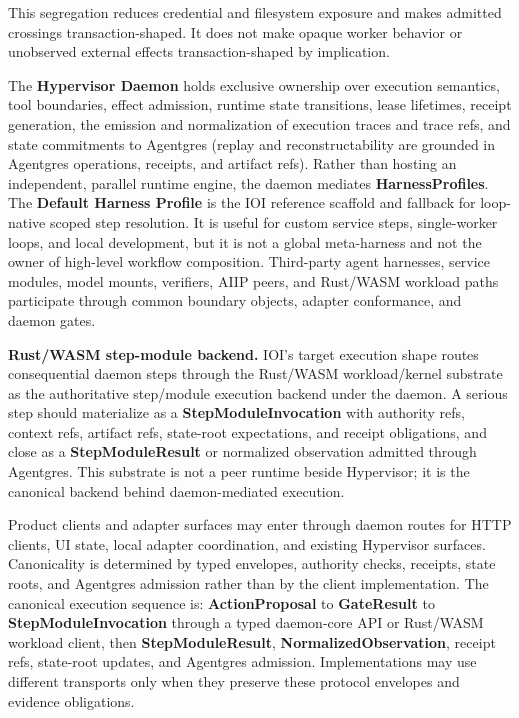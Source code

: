 \documentclass[
  11pt,
]{article}
\begin{document}
This segregation reduces credential and filesystem exposure and makes admitted
crossings transaction-shaped. It does not make opaque worker behavior or
unobserved external effects transaction-shaped by implication.

The \textbf{Hypervisor Daemon} holds exclusive ownership over execution
semantics, tool boundaries, effect admission, runtime state transitions,
lease lifetimes, receipt generation, the emission and normalization of
execution traces and trace refs, and state commitments to Agentgres
(replay and reconstructability are grounded in Agentgres operations,
receipts, and artifact refs). Rather than hosting an independent,
parallel runtime engine, the daemon mediates \textbf{HarnessProfiles}.
The \textbf{Default Harness Profile} is the IOI reference scaffold and
fallback for loop-native scoped step resolution. It is useful for
custom service steps, single-worker loops, and local development, but it
is not a global meta-harness and not the owner of high-level workflow
composition. Third-party agent harnesses, service modules, model
mounts, verifiers, AIIP peers, and Rust/WASM workload paths participate
through common boundary objects, adapter conformance, and daemon gates.

\textbf{Rust/WASM step-module backend.} IOI's target execution shape routes
consequential daemon steps through the Rust/WASM workload/kernel
substrate as the authoritative step/module execution backend under the
daemon. A serious step should materialize as a
\textbf{StepModuleInvocation} with authority refs, context refs,
artifact refs, state-root expectations, and receipt obligations, and
close as a \textbf{StepModuleResult} or normalized observation admitted
through Agentgres. This substrate is not a peer runtime beside
Hypervisor; it is the canonical backend behind daemon-mediated
execution.

Product clients and adapter surfaces may enter through daemon routes for
HTTP clients, UI state, local adapter coordination, and existing Hypervisor
surfaces. Canonicality is determined by typed envelopes, authority
checks, receipts, state roots, and Agentgres admission rather than by the
client implementation. The canonical execution sequence is:
\textbf{ActionProposal} to \textbf{GateResult} to
\textbf{StepModuleInvocation} through a typed daemon-core API or
Rust/WASM workload client, then \textbf{StepModuleResult},
\textbf{NormalizedObservation}, receipt refs, state-root updates, and
Agentgres admission. Implementations may use different transports only
when they preserve these protocol envelopes and evidence obligations.
\end{document}
